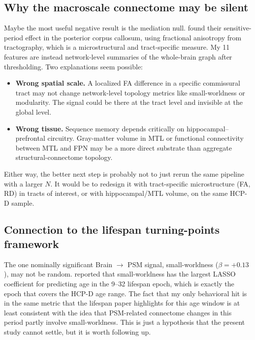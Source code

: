 \documentclass[11pt]{article}
\begin{document}
\subsection{Why the macroscale connectome may be silent}
Maybe the most useful negative result is the mediation null. \citet{steele2013} found their sensitive-period effect in the posterior corpus callosum, using fractional anisotropy from tractography, which is a microstructural and tract-specific measure. My 11 features are instead network-level summaries of the whole-brain graph after thresholding. Two explanations seem possible:
\begin{itemize}[leftmargin=1.4em,itemsep=2pt]
  \item \textbf{Wrong spatial scale.} A localized FA difference in a specific commissural tract may not change network-level topology metrics like small-worldness or modularity. The signal could be there at the tract level and invisible at the global level.
  \item \textbf{Wrong tissue.} Sequence memory depends critically on hippocampal--prefrontal circuitry. Gray-matter volume in MTL or functional connectivity between MTL and FPN may be a more direct substrate than aggregate structural-connectome topology.
\end{itemize}
Either way, the better next step is probably not to just rerun the same pipeline with a larger $N$. It would be to redesign it with tract-specific microstructure (FA, RD) in tracts of interest, or with hippocampal/MTL volume, on the same HCP-D sample.

\subsection{Connection to the lifespan turning-points framework}
The one nominally significant Brain $\to$ PSM signal, small-worldness ($\beta=+0.13$), may not be random. \citet{mousley2025} reported that small-worldness has the largest LASSO coefficient for predicting age in the 9--32 lifespan epoch, which is exactly the epoch that covers the HCP-D age range. The fact that my only behavioral hit is in the same metric that the lifespan paper highlights for this age window is at least consistent with the idea that PSM-related connectome changes in this period partly involve small-worldness. This is just a hypothesis that the present study cannot settle, but it is worth following up.
\end{document}
